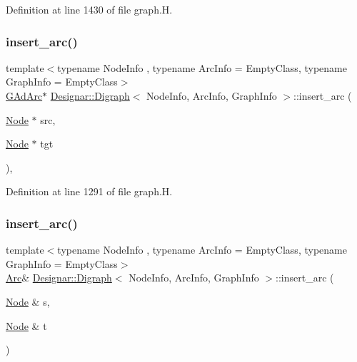 Definition at line 1430 of file graph.\+H.

\mbox{\label{class_designar_1_1_digraph_a9180c479d24dc8dc648a37451c90d066}} 
\subsubsection{\texorpdfstring{insert\+\_\+arc()}{insert\_arc()}\hspace{0.1cm}{\footnotesize\ttfamily [1/4]}}
{\footnotesize\ttfamily template$<$typename Node\+Info , typename Arc\+Info  = Empty\+Class, typename Graph\+Info  = Empty\+Class$>$ \\
\hyperlink{class_designar_1_1_digraph_a0c6d846f23d1e82556fb6055557df53f}{G\+Ad\+Arc}$\ast$ \hyperlink{class_designar_1_1_digraph}{Designar\+::\+Digraph}$<$ Node\+Info, Arc\+Info, Graph\+Info $>$\+::insert\+\_\+arc (\begin{DoxyParamCaption}\item[{\hyperlink{class_designar_1_1_digraph_a4dc921c41a480b7946a04170e997d8ae}{Node} $\ast$}]{src,  }\item[{\hyperlink{class_designar_1_1_digraph_a4dc921c41a480b7946a04170e997d8ae}{Node} $\ast$}]{tgt }\end{DoxyParamCaption})\hspace{0.3cm}{\ttfamily [inline]}, {\ttfamily [protected]}}



Definition at line 1291 of file graph.\+H.

\mbox{\label{class_designar_1_1_digraph_a52b127c0102e207125c6f4eaaeb7ab26}} 
\subsubsection{\texorpdfstring{insert\+\_\+arc()}{insert\_arc()}\hspace{0.1cm}{\footnotesize\ttfamily [2/4]}}
{\footnotesize\ttfamily template$<$typename Node\+Info , typename Arc\+Info  = Empty\+Class, typename Graph\+Info  = Empty\+Class$>$ \\
\hyperlink{class_designar_1_1_digraph_a0ceb278671f2a535c00fddccdeafd69f}{Arc}\& \hyperlink{class_designar_1_1_digraph}{Designar\+::\+Digraph}$<$ Node\+Info, Arc\+Info, Graph\+Info $>$\+::insert\+\_\+arc (\begin{DoxyParamCaption}\item[{\hyperlink{class_designar_1_1_digraph_a4dc921c41a480b7946a04170e997d8ae}{Node} \&}]{s,  }\item[{\hyperlink{class_designar_1_1_digraph_a4dc921c41a480b7946a04170e997d8ae}{Node} \&}]{t }\end{DoxyParamCaption})\hspace{0.3cm}{\ttfamily [inline]}}



